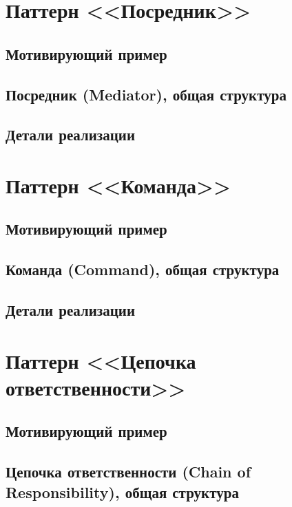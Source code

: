 \documentclass[a5paper]{article}
\begin{document}
\section{Паттерн <<Посредник>>}

\subsection{Мотивирующий пример}

\subsection{Посредник (Mediator), общая структура}

\subsection{Детали реализации}



\section{Паттерн <<Команда>>}

\subsection{Мотивирующий пример}

\subsection{Команда (Command), общая структура}

\subsection{Детали реализации}



\section{Паттерн <<Цепочка ответственности>>}

\subsection{Мотивирующий пример}

\subsection{Цепочка ответственности (Chain of Responsibility), общая структура}
\end{document}
